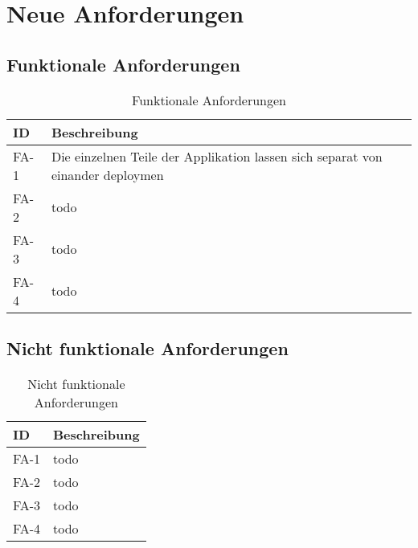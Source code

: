 \section{Neue Anforderungen}

\subsection{Funktionale Anforderungen}

\begin{table}[H]
	\centering
	\caption{Funktionale Anforderungen}
	\begin{tabular}{ | p{2cm} | p{14cm} | }
		\toprule
		{\textbf{ID}} & {\textbf{Beschreibung}} \\
		\midrule
		FA-1 & Die einzelnen Teile der Applikation lassen sich separat von einander deploymen \\ \hline
		FA-2 & todo \\ \hline
		FA-3 & todo \\ \hline
		FA-4 & todo \\
		\bottomrule
	\end{tabular}
\end{table}

\subsection{Nicht funktionale Anforderungen}

\begin{table}[H]
	\centering
	\caption{Nicht funktionale Anforderungen}
	\begin{tabular}{ | p{2cm} | p{14cm} | }
		\toprule
		{\textbf{ID}} & {\textbf{Beschreibung}} \\
		\midrule
		FA-1 & todo \\ \hline
		FA-2 & todo \\ \hline
		FA-3 & todo \\ \hline
		FA-4 & todo \\
		\bottomrule
	\end{tabular}
\end{table}

